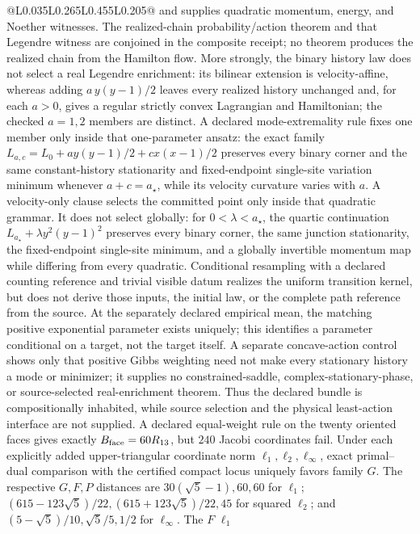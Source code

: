 \documentclass[10pt]{article}
\begin{document}
\begin{center}
\begin{longtable}{@{}L{0.035\linewidth}L{0.265\linewidth}L{0.455\linewidth}L{0.205\linewidth}@{}}
and supplies quadratic momentum, energy, and Noether witnesses. The
realized-chain probability/action theorem and that Legendre witness are
conjoined in the composite receipt; no theorem produces the realized chain
from the Hamilton flow. More strongly, the binary history law does not
select a real Legendre enrichment: its bilinear extension is velocity-affine,
whereas adding \(a\,y(y-1)/2\) leaves every realized history unchanged and,
for each \(a>0\), gives a regular strictly convex Lagrangian and Hamiltonian;
the checked \(a=1,2\) members are distinct. A declared mode-extremality rule
fixes one member only inside that one-parameter ansatz: the exact family
\(L_{a,c}=L_0+a y(y-1)/2+c x(x-1)/2\) preserves every binary corner and the
same constant-history stationarity and fixed-endpoint single-site variation
minimum whenever \(a+c=a_\star\),
while its velocity curvature varies with \(a\). A velocity-only clause selects
the committed point only inside that quadratic grammar. It does not
select globally: for \(0<\lambda<a_\star\), the quartic continuation
\(L_{a_\star}+\lambda y^2(y-1)^2\) preserves every binary corner, the same
junction stationarity, the fixed-endpoint single-site minimum, and a globally
invertible momentum map while differing from every quadratic. Conditional resampling with a
declared counting reference and trivial visible datum realizes the uniform
transition kernel, but does not derive those inputs, the initial law, or the
complete path reference from the source.  At the separately declared
empirical mean, the matching positive exponential parameter exists uniquely;
this identifies a parameter conditional on a target, not the target itself.
A separate concave-action control
shows only that positive Gibbs weighting need not make every stationary
history a mode or minimizer; it supplies no constrained-saddle,
complex-stationary-phase, or source-selected real-enrichment theorem. Thus the
declared bundle is compositionally inhabited, while source selection and the
physical least-action interface are not supplied. A declared equal-weight rule on
the twenty oriented faces gives exactly \(B_{\rm face}=60R_{13}\), but \(240\) Jacobi coordinates
fail. Under each explicitly added upper-triangular coordinate norm
\(\ell_1,\ell_2,\ell_\infty\), exact primal--dual comparison with the
certified compact locus uniquely favors family \(G\). The respective
\(G,F,P\) distances are
\(30(\sqrt5-1),60,60\) for \(\ell_1\);
\((615-123\sqrt5)/22,(615+123\sqrt5)/22,45\) for squared \(\ell_2\); and
\((5-\sqrt5)/10,\sqrt5/5,1/2\) for \(\ell_\infty\). The \(F\) \(\ell_1\)

\end{longtable}
\end{center}
\end{document}
